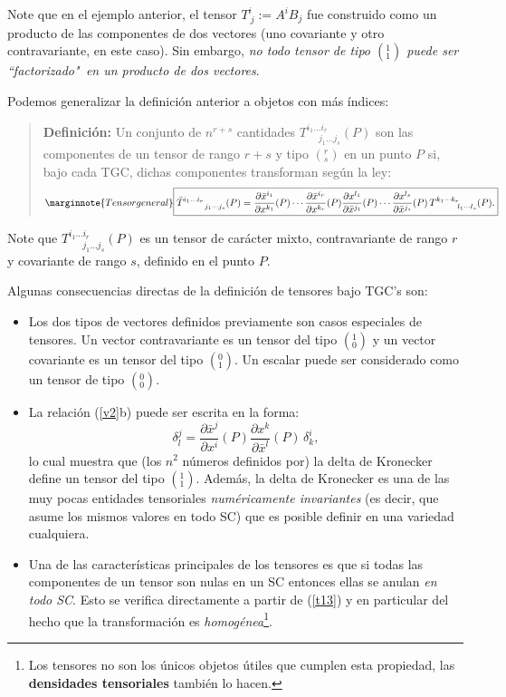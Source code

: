 Note que en el ejemplo anterior, el tensor $T^i_{\ j}:=A^i B_j$ fue construido como un producto de las componentes de dos vectores (uno covariante y otro contravariante, en este caso). Sin embargo, \textit{no todo tensor de tipo $(^1_1)$ puede ser ``factorizado"\, en un producto de dos vectores}.

Podemos generalizar la definición anterior a objetos con más índices:
\begin{quotation}
\textbf{Definición:} Un conjunto de $n^{r+s}$ cantidades $T_{\ \ \ \ \ \
j_1\dots j_{s}}^{i_1\dots i_{r}}(P)$ son las componentes de un tensor de
rango $r+s$ y tipo $(^r_s)$ en un punto $P$ si, bajo cada TGC, dichas componentes
transforman según la ley:
\begin{equation}\marginnote{Tensor general}
\boxed{\bar{T}_{\ \ \ \ \ \ \ j_1\cdots j_{s}}^{i_1\dots
i_{r}}(P)=\frac{\partial\bar{x}^{i_1}
}{\partial x^{k_1}}(P)\cdots \frac{\partial\bar{x}^{i_{r}}}{\partial
x^{k_{r}}}(P)\frac{\partial x^{l_1}}{\partial\bar{x}^{j_1}}(P)\cdots
\frac{\partial x^{l_{s}}}{\partial\bar{x}^{j_{s}}}(P)\,T_{\ \ \ \ \ \ \
l_1\cdots l_{s}}^{k_1\cdots k_{r}}(P).}
\label{t13}
\end{equation}
\end{quotation}
Note que $T_{\ \ \ \ \ \ \ j_1\dots j_s}^{i_1\dots i_r}(P)$ es un tensor de
carácter mixto, contravariante de rango $r$ y covariante de rango $s$, definido en
el punto $P$.

Algunas consecuencias directas de la definición de tensores bajo TGC's son:
\begin{itemize}
\item Los dos tipos de vectores definidos previamente son casos
especiales de tensores. Un vector contravariante es un tensor del tipo
$(^1_0)$ y un vector covariante es un tensor del tipo $(^0_1)$. Un
escalar puede ser considerado como un tensor de tipo $(^0_0)$.

\item La relación (\ref{v2}b) puede ser escrita en la forma:
\begin{equation}
\delta_l^j =\frac{\partial\bar{x}^j}{\partial x^i}(P)\frac{\partial
x^k}{\partial\bar{x}^l}(P)\,\delta_k^i , \label{t15}
\end{equation}
lo cual muestra que (los $n^2$ números definidos por) la delta de Kronecker
define un tensor del tipo $(^1_1)$. Además, la delta de Kronecker es una de las muy pocas entidades tensoriales \textit{numéricamente invariantes} (es decir, que asume los mismos valores en todo SC) que es posible definir en una variedad cualquiera.

\item Una de las características principales de los tensores es que si
todas las componentes de un tensor son nulas en un SC entonces ellas se anulan
\textit{en todo SC}. Esto se verifica directamente a partir de (\ref{t13}) y en
particular del hecho que la transformación es \textit{homogénea}\footnote{Los tensores no son los únicos objetos útiles que cumplen esta propiedad, las \textbf{densidades tensoriales} también lo hacen.}.
\end{itemize}

